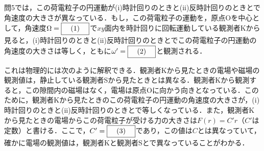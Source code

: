 \begin{enumerate}[label = {〔 \Roman* 〕}]
\begin{enumerate}[label={問\arabic*}, resume]
        問5では，この荷電粒子の円運動が(i)時計回りのときと(ii)反時計回りのときとで角速度の大きさが異なっている．もし，この荷電粒子の運動を，原点Oを中心として，角速度$\Omega = \text{\boxnum{1}}$で$xy$面内を時計回りに回転運動している観測者Kから見ると，(i)時計回りのときと(ii)反時計回りのときとでこの荷電粒子の円運動の角速度の大きさは等しく，ともに$\omega ' = \text{\boxnum{2}}$と観測される．

        これは物理的には次のように解釈できる．観測者Kから見たときの電場や磁場の観測値は，静止している観測者Sから見たときとは異なる．観測者Kから観測すると，この隙間内の磁場はなく，電場は原点Oに向かう向きとなっている．このために，観測者Kから見たときのこの荷電粒子の円運動の角速度の大きさが，(i)時計回りのときと(ii)反時計回りのときとで等しくなっている．また，観測者Kから見たときの電場からこの荷電粒子が受ける力の大きさは$F(r) = C' r$（$C'$は定数）と書ける．ここで，$C' = \text{\boxnum{3}}$であり，この値は$C$とは異なっていて，確かに電場の観測値は，観測者Kと観測者Sとで異なっていることがわかる．
    \end{enumerate}
\end{enumerate}

